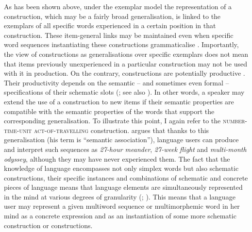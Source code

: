 As has been shown above, under the exemplar model the representation of a construction, which may be a fairly broad generalisation, is linked to the exemplars of all specific words experienced in a certain position in that construction. These item-general links may be maintained even when specific word sequences instantiating these constructions grammaticalise \citep{torres-walker-2009}. Importantly, the view of constructions as generalisations over specific exemplars does not mean that items previously unexperienced in a particular construction may not be used with it in production. On the contrary, constructions are potentially productive \citep{goldberg-2006,lieven-2010}. Their productivity depends on the  semantic -- and sometimes even formal -- specifications of their schematic slots (\citealt[57--59]{bybee-cxg-2013}; see also \citealt{zeschel-2010}). In other words, a speaker may extend the use of a construction to new items if their semantic properties are compatible with the semantic properties of the words that support the corresponding generalisation. To illustrate this point, I again refer to the \textsc{number-time-unit act-of-travelling} construction. \citet{hoey-lexical-2005} argues that thanks to this generalisation (his term is ``semantic association''), language users can produce and interpret such sequences as \textit{27-hour meander}, \textit{27-week flight} and \textit{multi-month odyssey}, although they may have never experienced them. The fact that the knowledge of language encompasses not only simplex words but also schematic constructions, their specific instances and combinations of schematic and concrete pieces of language means that language elements are simultaneously represented in the mind at various degrees of granularity (\citealt{goldberg-2006,bybee-repetition-2006,tomasello-constructing-2003}; \citealt[see][63--76 for the view of grammar as a structured inventory of linguistic units]{langacker-foundations-1987}). This means that a language user may represent a given multiword sequence or multimorphemic word in her mind as a concrete expression and as an instantiation of some more schematic construction or constructions. 

